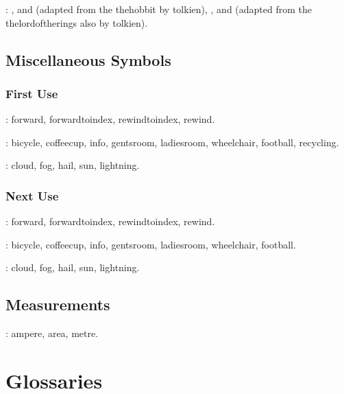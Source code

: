 \documentclass{scrreprt}
\newcommand{\measurement}{\gls}
\begin{document}
: , 
and  (adapted from the
 \gls{thehobbit} by \gls{tolkien}), 
, 
and  (adapted from the
 \gls{thelordoftherings} also by \gls{tolkien}).

\section{Miscellaneous Symbols}

\subsection{First Use}

: \gls{forward}, \gls{forwardtoindex},
\gls{rewindtoindex}, \gls{rewind}.

: \gls{bicycle}, \gls{coffeecup}, \gls{info},
\gls{gentsroom}, \gls{ladiesroom}, \gls{wheelchair}, \gls{football},
\gls{recycling}.

: \gls{cloud}, \gls{fog}, \gls{hail}, \gls{sun},
\gls{lightning}.

\subsection{Next Use}

: \gls{forward}, \gls{forwardtoindex},
\gls{rewindtoindex}, \gls{rewind}.

: \gls{bicycle}, \gls{coffeecup}, \gls{info},
\gls{gentsroom}, \gls{ladiesroom}, \gls{wheelchair}, \gls{football}.

: \gls{cloud}, \gls{fog}, \gls{hail}, \gls{sun},
\gls{lightning}.

\section{Measurements}

:
\measurement{ampere}, \measurement{area}, \measurement{metre}.

\chapter{Glossaries}
\printunsrtglossary[type=bacteria,style=mcoltree]
\printunsrtglossary[type=markuplanguage,style=altlist]
\printunsrtglossary[type=vegetable,style=tree,nogroupskip]
\printunsrtglossary[type=mineral,style=treegroup]
\printunsrtglossary[type=animal,style=tree]
\printunsrtglossary[type=person,style=tree,nogroupskip]
\printunsrtglossary[type=book,style=tree,nogroupskip]
\printunsrtglossary[type=film,style=tree,nogroupskip]
\end{document}
